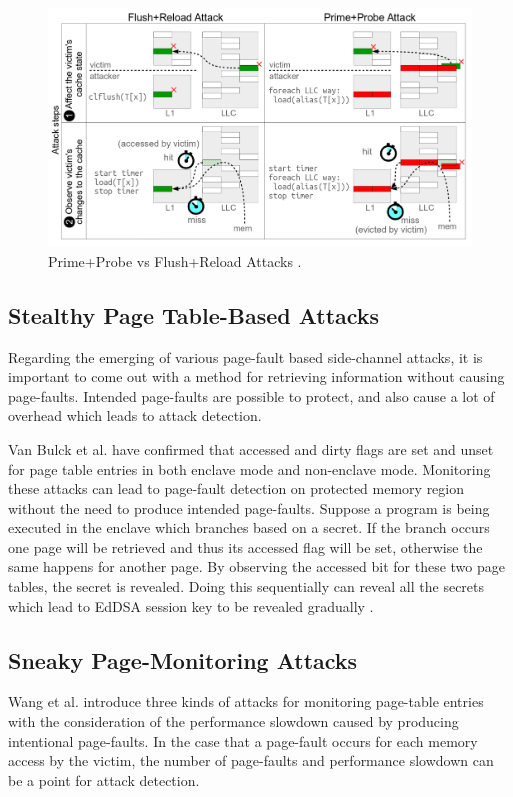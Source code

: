 \begin{figure}
	\includegraphics[scale=0.28]{images/ppfr}
	\caption{Prime+Probe vs Flush+Reload Attacks \cite{kayaalp2016high}.}
	\label{fig:ppfr}
\end{figure}

\subsection{Stealthy Page Table-Based Attacks}
Regarding the emerging of various page-fault based side-channel attacks, it is important to come out with a method for retrieving information without causing page-faults. Intended page-faults are possible to protect, and also cause a lot of overhead which leads to attack detection.

Van Bulck et al. \cite{stealthy} have confirmed that accessed and dirty flags are set and unset for page table entries in both enclave mode and non-enclave mode. Monitoring these attacks can lead to page-fault detection on protected memory region without the need to produce intended page-faults. Suppose a program is being executed in the enclave which branches based on a secret. If the branch occurs one page will be retrieved and thus its accessed flag will be set, otherwise the same happens for another page. By observing the accessed bit for these two page tables, the secret is revealed. Doing this sequentially can reveal all the secrets which lead to EdDSA session key to be revealed gradually \cite{stealthy}.


\subsection{Sneaky Page-Monitoring Attacks}
Wang et al. \cite{leakycauldron} introduce three kinds of attacks for monitoring page-table entries with the consideration of the performance slowdown caused by producing intentional page-faults. In the case that a page-fault occurs for each memory access by the victim, the number of page-faults and performance slowdown can be a point for attack detection.
